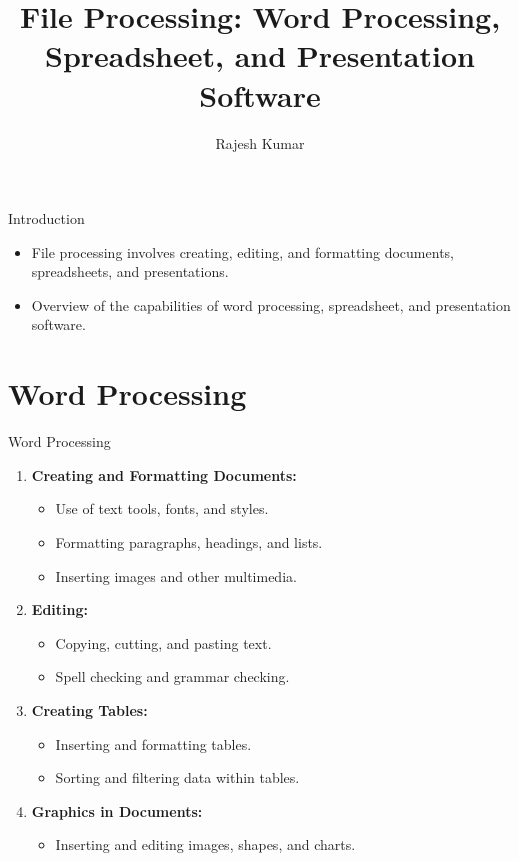 
\title{File Processing: Word Processing, Spreadsheet, and Presentation Software}
\author{Rajesh Kumar}
\date{}

\begin{frame}
  \titlepage
\end{frame}

\begin{frame}{Introduction}
  \begin{itemize}
    \item File processing involves creating, editing, and formatting documents, spreadsheets, and presentations.
    \item Overview of the capabilities of word processing, spreadsheet, and presentation software.
  \end{itemize}
\end{frame}

\section{Word Processing}

\begin{frame}{Word Processing}
  \begin{enumerate}
    \item \textbf{Creating and Formatting Documents:}
      \begin{itemize}
        \item Use of text tools, fonts, and styles.
        \item Formatting paragraphs, headings, and lists.
        \item Inserting images and other multimedia.
      \end{itemize}
    \item \textbf{Editing:}
      \begin{itemize}
        \item Copying, cutting, and pasting text.
        \item Spell checking and grammar checking.
      \end{itemize}
    \item \textbf{Creating Tables:}
      \begin{itemize}
        \item Inserting and formatting tables.
        \item Sorting and filtering data within tables.
      \end{itemize}
    \item \textbf{Graphics in Documents:}
      \begin{itemize}
        \item Inserting and editing images, shapes, and charts.
      \end{itemize}
  \end{enumerate}
\end{frame}

